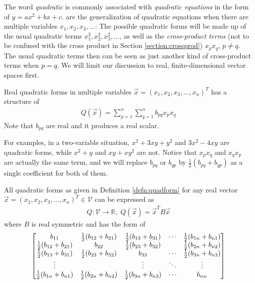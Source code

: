 The word \textit{quadratic} is commonly associated with \textit{quadratic equations} in the form of $y = ax^2 + bx + c$.  are the generalization of quadratic equations when there are multiple variables $x_1, x_2, x_3, \ldots$: The possible quadratic forms will be made up of the usual quadratic terms $x_1^2, x_2^2, x_3^2, \ldots$, as well as the \textit{cross-product terms} (not to be confused with the cross product in Section \ref{section:crossprod}) $x_px_q$, $p \neq q$. The usual quadratic terms then can be seen as just another kind of cross-product terms when $p = q$. We will limit our discussion to real, finite-dimensional vector spaces first.
\begin{defn}
\label{defn:quadform}
Real quadratic forms in multiple variables $\vec{x} = (x_1, x_2, x_3, \ldots, x_n)^T$ has a structure of
\begin{align*}
Q(\vec{x}) = \sum_{p=1}^{n}\sum_{q=1}^{n} b_{pq} x_px_q
\end{align*}
Note that $b_{pq}$ are real and it produces a real scalar.
\end{defn}
For examples, in a two-variable situation, $x^2 + 3xy + y^2$ and $3x^2 - 4xy$ are quadratic forms, while $x^2 + y$ and $xy + xy^2$ are not. Notice that $x_px_q$ and $x_qx_p$ are actually the same term, and we will replace $b_{pq}$ or $b_{qp}$ by $\frac{1}{2}(b_{pq} + b_{qp})$ as a single coefficient for both of them. 
\begin{proper}
\label{proper:quadformmatrix}
All quadratic forms as given in Definition \ref{defn:quadform} for any real vector $\vec{x} = (x_1, x_2, x_3, \ldots, x_n)^T \in \mathcal{V}$ can be expressed as
\begin{align*}
Q: \mathcal{V} \to \mathbb{R},\; Q(\vec{x}) = \vec{x}^TB\vec{x}
\end{align*}
where $B$ is real symmetric and has the form of
\begin{align*}
\left[\begin{array}{@{}ccccc@{}}
b_{11} & \frac{1}{2}(b_{12} + b_{21}) & \frac{1}{2}(b_{13} + b_{31}) & \cdots & \frac{1}{2}(b_{1n} + b_{n1}) \\
\frac{1}{2}(b_{12} + b_{21}) & b_{22} & \frac{1}{2}(b_{23} + b_{32}) & & \frac{1}{2}(b_{2n} + b_{n2}) \\
\frac{1}{2}(b_{13} + b_{31}) & \frac{1}{2}(b_{23} + b_{32}) & b_{33} & \cdots & \frac{1}{2}(b_{3n} + b_{n3})\\
\vdots &  & \vdots & \ddots & \vdots \\
\frac{1}{2}(b_{1n} + b_{n1}) & \frac{1}{2}(b_{2n} + b_{n2}) & \frac{1}{2}(b_{3n} + b_{n3}) & \cdots & b_{nn}
\end{array}\right]
\end{align*}
\end{proper}
